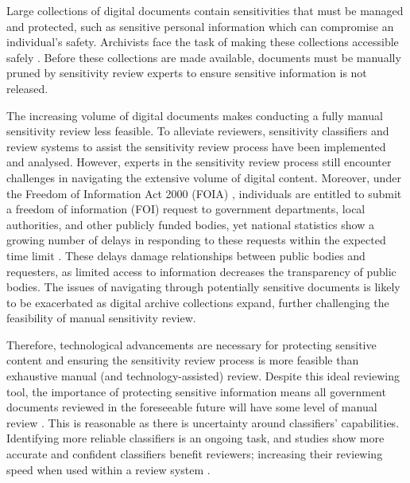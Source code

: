 Large collections of digital documents contain sensitivities that must be managed and protected, such as sensitive personal information which can compromise an individual's safety. Archivists face the task of making these collections accessible safely \cite{gollins2014using}. Before these collections are made available, documents must be manually pruned by sensitivity review experts to ensure sensitive information is not released.

The increasing volume of digital documents makes conducting a fully manual sensitivity review less feasible. To alleviate reviewers, sensitivity classifiers \cite{mcdonald2014towards, mcdonald2017enhancing, baron2022providing} and review systems \cite{narvala2022sensitivity} to assist the sensitivity review process have been implemented and analysed. However, experts in the sensitivity review process still encounter challenges in navigating the extensive volume of digital content. Moreover, under the Freedom of Information Act 2000 (FOIA) \cite{FOIA:00}, individuals are entitled to submit a freedom of information (FOI) request to government departments, local authorities, and other publicly funded bodies, yet national statistics show a growing number of delays in responding to these requests within the expected time limit \cite{SG:23, ONS:23}. These delays damage relationships between public bodies and requesters, as limited access to information decreases the transparency of public bodies. The issues of navigating through potentially sensitive documents is likely to be exacerbated as digital archive collections expand, further challenging the feasibility of manual sensitivity review.

Therefore, technological advancements are necessary for protecting sensitive content and ensuring the sensitivity review process is more feasible than exhaustive manual (and technology-assisted) review. Despite this ideal reviewing tool, the importance of protecting sensitive information means all government documents reviewed in the foreseeable future will have some level of manual review \cite{TNA:16}. This is reasonable as there is uncertainty around classifiers’ capabilities. Identifying more reliable classifiers is an ongoing task, and studies show more accurate and confident classifiers benefit reviewers; increasing their reviewing speed when used within a review system \cite{mcdonald2020accuracy}.

